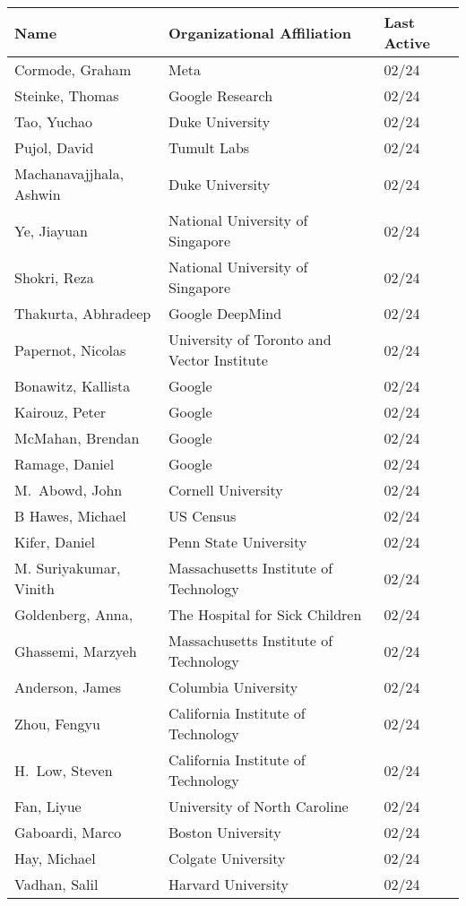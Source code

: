 \documentclass[localFont,alternative]{documentMETADATA}
\begin{document}
\centering
\begin{tabular}{lll}
\toprule
\textbf{Name} & \textbf{Organizational Affiliation} & \textbf{Last Active} \\
\midrule
	 Cormode, Graham & Meta  	& 02/24\\
	 Steinke, Thomas & Google Research 	& 02/24\\
	 Tao, Yuchao & Duke University 	& 02/24\\
	 Pujol, David & Tumult Labs 	& 02/24\\
	 Machanavajjhala, Ashwin & Duke University 	& 02/24\\
	 Ye, Jiayuan & National University of Singapore 	& 02/24\\
	 Shokri, Reza & National University of Singapore 	& 02/24\\
	  Thakurta, Abhradeep & Google DeepMind  	& 02/24\\
	 Papernot, Nicolas & University of Toronto and Vector Institute 	& 02/24\\
	 Bonawitz, Kallista & Google 	& 02/24\\
	 Kairouz, Peter & Google 	& 02/24\\
	 McMahan, Brendan & Google 	& 02/24\\
	 Ramage, Daniel & Google  	& 02/24\\
	 M.~Abowd, John & Cornell University 	& 02/24\\
	 B Hawes, Michael & US Census 	& 02/24\\
	  Kifer, Daniel & Penn State University 	& 02/24\\
	  M. Suriyakumar, Vinith & Massachusetts Institute of Technology 	& 02/24\\
	 Goldenberg, Anna, & The Hospital for Sick Children 	& 02/24\\
	 Ghassemi, Marzyeh & Massachusetts Institute of Technology 	& 02/24\\
	 Anderson, James & Columbia University 	& 02/24\\
	 Zhou, Fengyu & California Institute of Technology 	& 02/24\\
	 H.~Low, Steven & California Institute of Technology 	& 02/24\\
	 Fan, Liyue & University of North Caroline 	& 02/24\\
	 Gaboardi, Marco & Boston University 	& 02/24\\
	 Hay, Michael & Colgate University 	& 02/24\\
	 Vadhan, Salil & Harvard University 	& 02/24\\

\end{tabular}
\end{document}
